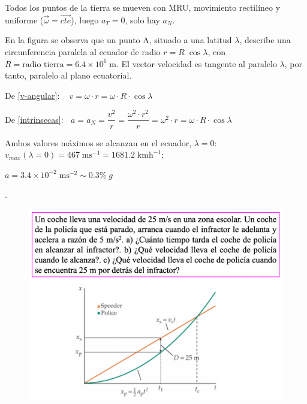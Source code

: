 Todos los puntos de la tierra se mueven con MRU, movimiento rectilíneo y uniforme ($\vec \omega =\overrightarrow{cte}$), luego $a_T=0$, solo hay $a_N$.

En la figura se observa que un punto A, situado a una latitud $\lambda$, describe una circunferencia paralela al ecuador de radio $r=R\; \cos \lambda$, con $R=\text{radio tierra}=6.4\times 10^6\; \mathrm{m}$.
El vector velocidad es tangente al paralelo $\lambda$, por tanto, paralelo al plano ecuatorial.

De  \ref{v-angular}: $\;\;\;v=\omega \cdot r =\omega\cdot R\cdot \cos \lambda$

De \ref{intrinsecas}: $\;\;a=a_N=\displaystyle \dfrac {v^2}r=\dfrac {\omega^2 \cdot r^2}r=\omega^2\cdot r=\omega\cdot R \cdot \cos \lambda$

Ambos valores máximos se alcanzan en el ecuador, $\lambda=0$:
$v_{max}(\lambda=0)=467 \;\mathrm{ms}^{-1}=1681.2\; \mathrm{kmh}^{-1};$

$ a=3.4\times 10^{-2} \; \mathrm{ms}^{-2} \sim 0.3\%\; g$

\vspace{10mm} %
\begin{prob}.
	\begin{figure}[H]
		\centering
		\includegraphics[width=.8\textwidth]{imagenes/imagenes02/T02IM25.png}
		\end{figure}
\end{prob}


